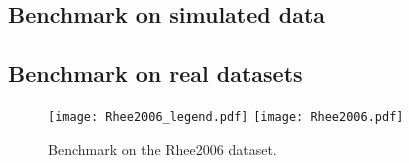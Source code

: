 \subsection{Benchmark on simulated data}

\subsection{Benchmark on real datasets}
\begin{figure}[htbp]
    \centering
    \texttt{[image: Rhee2006\_legend.pdf]}
    \texttt{[image: Rhee2006.pdf]}
    \caption{Benchmark on the Rhee2006 dataset.}
    \label{fig:Rhee2006}
  \end{figure}